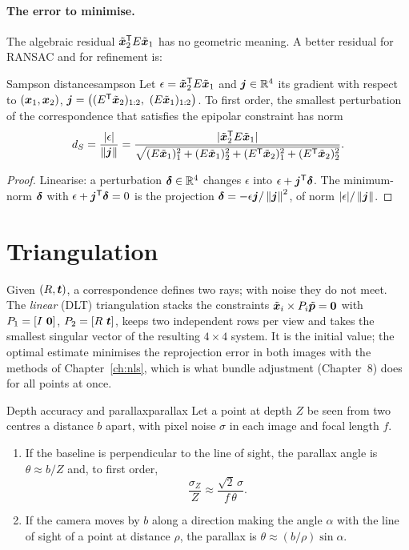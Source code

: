 \paragraph{The error to minimise.} The algebraic residual
$\tilde{\bm{x}}_2^{\mathsf{T}} E\tilde{\bm{x}}_1$ has no geometric meaning. A
better residual for RANSAC and for refinement is:

\begin{proposition}{Sampson distance}{sampson}
Let $\epsilon=\tilde{\bm{x}}_2^{\mathsf{T}} E\tilde{\bm{x}}_1$ and $\bm{j}\in
\mathbb{R}^4$ its gradient with respect to $(\bm{x}_1,\bm{x}_2)$,
$\vect{j}=\bigl((E\T\tilde{\vect{x}}_2)_{1:2},\ (E\tilde{\vect{x}}_1)_{
1:2}\bigr)$. To first order, the smallest perturbation of the
correspondence that satisfies the epipolar constraint has norm
\[
d_S=\frac{|\epsilon|}{\left\lVert \bm{j}\right\rVert}=\frac{|\tilde{\bm{x}}_2^{\mathsf{T}}
E\tilde{\bm{x}}_1|}{\sqrt{(E\tilde{\bm{x}}_1)_1^2+(E\tilde{
\bm{x}}_1)_2^2+(E^{\mathsf{T}}\tilde{\bm{x}}_2)_1^2+(E^{\mathsf{T}}\tilde{\bm{x}}_2)_2^2
}} .
\]
\end{proposition}

\begin{proof}
Linearise: a perturbation $\bm{\delta}\in\mathbb{R}^4$ changes $\epsilon$ into
$\epsilon+\bm{j}^{\mathsf{T}}\bm{\delta}$. The minimum-norm $\bm{\delta}$ with
$\epsilon+\bm{j}^{\mathsf{T}}\bm{\delta}=0$ is the projection
$\bm{\delta}=-\epsilon\bm{j}/\left\lVert \bm{j}\right\rVert^2$, of norm $|\epsilon|/
\left\lVert \bm{j}\right\rVert$.
\end{proof}

\section{Triangulation}

Given $(R,\bm{t})$, a correspondence defines two rays; with noise they
do not meet. The \emph{linear} (DLT) triangulation stacks the
constraints $\tilde{\bm{x}}_i\times P_i\tilde{\bm{p}}=\bm{0}$ with
$P_1=[I\ \vect0]$, $P_2=[R\ \bm{t}]$, keeps two independent rows per
view and takes the smallest singular vector of the resulting $4\times4$
system. It is the initial value; the optimal estimate minimises the
reprojection error in both images with the methods of
Chapter~\ref{ch:nls}, which is what bundle adjustment (Chapter~8) does
for all points at once.

\begin{proposition}{Depth accuracy and parallax}{parallax}
Let a point at depth $Z$ be seen from two centres a distance $b$ apart,
with pixel noise $\sigma$ in each image and focal length $f$.
\begin{enumerate}[label=(\roman*),nosep]
\item If the baseline is perpendicular to the line of sight, the
  parallax angle is $\theta\approx b/Z$ and, to first order,
  \[
  \frac{\sigma_Z}{Z}\approx\frac{\sqrt2\,\sigma}{f\,\theta} .
  \]
\item If the camera moves by $b$ along a direction making the angle
  $\alpha$ with the line of sight of a point at distance $\rho$, the
  parallax is $\theta\approx(b/\rho)\sin\alpha$.
\end{enumerate}
\end{proposition}

